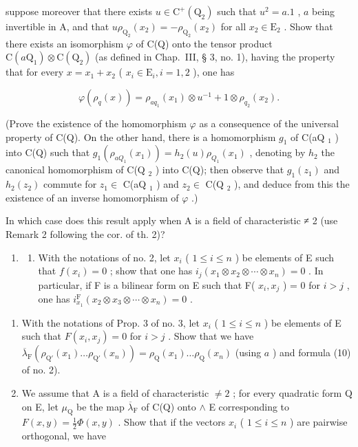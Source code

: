 suppose moreover that there exists \(u \in \mathrm{C}^{+}(\mathrm{Q}_{2})\) such that \(u^{2} = a.1\) , \(a\) being invertible in A, and that \(u\rho_{\mathrm{Q}_{2}}(x_{2}) = -\rho_{\mathrm{Q}_{2}}(x_{2})\) for all \(x_{2} \in \mathrm{E}_{2}\) . Show that there exists an isomorphism \(\varphi\) of C(Q) onto the tensor product \(\mathrm{C}(a\mathrm{Q}_{1}) \otimes \mathrm{C}(\mathrm{Q}_{2})\) (as defined in Chap.~III, § 3, no. 1), having the property that for every \(x = x_{1} + x_{2}\) ( \(x_{i} \in \mathrm{E}_{i}, i = 1, 2\) ), one has

\[
\varphi (\rho_ {q} (x)) = \rho_ {a q _ {1}} (x _ {1}) \otimes u ^ {- 1} + 1 \otimes \rho_ {q _ {2}} (x _ {2}).
\]

(Prove the existence of the homomorphism \(\varphi\) as a consequence of the universal property of C(Q). On the other hand, there is a homomorphism \(g_{1}\) of C(aQ \(_{1}\) ) into C(Q) such that \(g_{1}(\rho_{aQ_{1}}(x_{1})) = h_{2}(u)\rho_{Q_{1}}(x_{1})\) , denoting by \(h_{2}\) the canonical homomorphism of C(Q \(_{2}\) ) into C(Q); then observe that \(g_{1}(z_{1})\) and \(h_{2}(z_{2})\) commute for \(z_{1} \in\) C(aQ \(_{1}\) ) and \(z_{2} \in\) C(Q \(_{2}\) ), and deduce from this the existence of an inverse homomorphism of \(\varphi\) .)

In which case does this result apply when A is a field of characteristic ≠ 2 (use Remark 2 following the cor. of th. 2)?

\begin{enumerate}
\def\labelenumi{\arabic{enumi})}
\setcounter{enumi}{2}
\tightlist
\item
  \begin{enumerate}
  \def\labelenumii{\alph{enumii})}
  \tightlist
  \item
    With the notations of no. 2, let \(x_{i}\) ( \(1 \leqslant i \leqslant n\) ) be elements of E such that \(f(x_{i}) = 0\) ; show that one has \(i_{j}(x_{1} \otimes x_{2} \otimes \cdots \otimes x_{n}) = 0\) . In particular, if F is a bilinear form on E such that F( \(x_{i}, x_{j}\) ) = 0 for \(i > j\) , one has \(i_{x_{1}}^{\mathrm{F}}(x_{2} \otimes x_{3} \otimes \cdots \otimes x_{n}) = 0\) .
  \end{enumerate}
\end{enumerate}

\begin{enumerate}
\def\labelenumi{\alph{enumi})}
\setcounter{enumi}{1}
\tightlist
\item
  With the notations of Prop. 3 of no. 3, let \(x_i\) ( \(1 \leqslant i \leqslant n\) ) be elements of E such that \(F(x_i, x_j) = 0\) for \(i > j\) . Show that we have \(\overline{\lambda}_{\mathrm{F}}(\rho_{\mathrm{Q}'}(x_1) \ldots \rho_{\mathrm{Q}'}(x_n)) = \rho_{\mathrm{Q}}(x_1) \ldots \rho_{\mathrm{Q}}(x_n)\) (using \(a\) ) and formula (10) of no. 2).
\item
  We assume that A is a field of characteristic \(\neq 2\) ; for every quadratic form Q on E, let \(\mu_{\mathrm{Q}}\) be the map \(\overline{\lambda}_{\mathrm{F}}\) of C(Q) onto \(\wedge\) E corresponding to \(F(x, y) = \frac{1}{2}\Phi(x, y)\) . Show that if the vectors \(x_i\) ( \(1 \leqslant i \leqslant n\) ) are pairwise orthogonal, we have
\end{enumerate}

